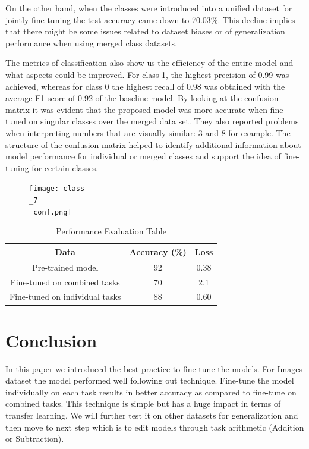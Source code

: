 \documentclass[conference]{IEEEtran}
\begin{document}

On the other hand, when the classes were introduced into a unified dataset for jointly fine-tuning the test accuracy came down to 70.03\%. This decline implies that there might be some issues related to dataset biases or of generalization performance when using merged class datasets.

The metrics of classification also show us the efficiency of the entire model and what aspects could be improved. For class 1, the highest precision of 0.99 was achieved, whereas for class 0 the highest recall of 0.98 was obtained with the average F1-score of 0.92 of the baseline model. By looking at the confusion matrix it was evident that the proposed model was more accurate when fine-tuned on singular classes over the merged data set. They also reported problems when interpreting numbers that are visually similar: 3 and 8 for example. The structure of the confusion matrix helped to identify additional information about model performance for individual or merged classes and support the idea of fine-tuning for certain classes.


\begin{figure}[h]
    \centering
    \texttt{[image: class\\\_7\\\_conf.png]}
    
\end{figure}

\begin{table}[htbp]
\caption{Performance Evaluation Table}
\begin{center}
\begin{tabular}{|c|c|c|}
\hline
\textbf{Data} & \textbf{Accuracy (\%)} & \textbf{Loss} \\ 
\hline
Pre-trained model & 92 & 0.38 \\ 
\hline
Fine-tuned on combined tasks & 70 & 2.1 \\ 
\hline
Fine-tuned on individual tasks & 88 & 0.60 \\ 
\hline
\end{tabular}
\label{tab:performance}
\end{center}
\end{table}



\section{Conclusion}
In this paper we introduced the best practice to fine-tune the models. For Images dataset the model performed well following out technique. Fine-tune the model individually on each task results in better accuracy as compared to fine-tune on combined tasks. This technique is simple but has a huge impact in terms of transfer learning. We will further test it on other datasets for generalization and then move to next step which is to edit models through task arithmetic (Addition or Subtraction).
\end{document}

